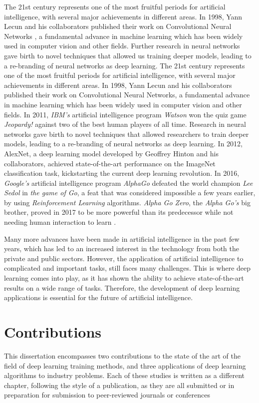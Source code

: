 The 21st century represents one of the most fruitful periods for artificial intelligence, with several major achievements in different areas. In 1998, Yann Lecun and his collaborators published their work on Convolutional Neural Networks \cite{lecun1999}, a fundamental advance in machine learning which has been widely used in computer vision and other fields. Further research in neural networks \cite{hinton2006, hinton2010} gave birth to novel techniques that allowed us training deeper models, leading to a re-branding of neural networks as deep learning. The 21st century represents one of the most fruitful periods for artificial intelligence, with several major achievements in different areas. In 1998, Yann Lecun and his collaborators published their work on Convolutional Neural Networks, a fundamental advance in machine learning which has been widely used in computer vision and other fields. In 2011, \textit{IBM's} artificial intelligence program \textit{Watson} won the quiz game \textit{Jeopardy!} against two of the best human players of all time. Research in neural networks gave birth to novel techniques that allowed researchers to train deeper models, leading to a re-branding of neural networks as deep learning. In 2012, AlexNet, a deep learning model developed by Geoffrey Hinton and his collaborators, achieved state-of-the-art performance on the ImageNet classification task, kickstarting the current deep learning revolution. In 2016, \textit{Google's} artificial intelligence program \textit{AlphaGo} \cite{silver2016} defeated the world champion \textit{Lee Sedol} in \textit{the game of Go}, a feat that was considered impossible a few years earlier, by using \textit{Reinforcement Learning} algorithms. \textit{Alpha Go Zero}, the \textit{Alpha Go's} big brother, proved in 2017 to be more powerful than its predecessor while not needing human interaction to learn \cite{Silver2017a, Silver2017b}.

Many more advances have been made in artificial intelligence in the past few years, which has led to an increased interest in the technology from both the private and public sectors. However, the application of artificial intelligence to complicated and important tasks, still faces many challenges. This is where deep learning comes into play, as it has shown the ability to achieve state-of-the-art results on a wide range of tasks. Therefore, the development of deep learning applications is essential for the future of artificial intelligence.


\section{Contributions}
This dissertation encompasses two contributions to the state of the art of the field of deep learning training methods, and three applications of deep learning algorithms to industry problems. Each of these studies is written as a different chapter, following the style of a publication, as they are all submitted or in preparation for submission to peer-reviewed journals or conferences

